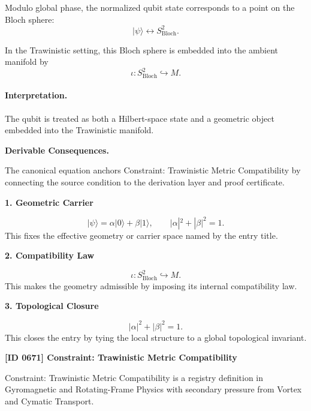 Modulo global phase, the normalized qubit state corresponds to a point on the Bloch sphere:
\begin{equation}
|\psi\rangle \longleftrightarrow S^2_{\mathrm{Bloch}} .
\end{equation}

In the Trawinistic setting, this Bloch sphere is embedded into the ambient manifold by
\begin{equation}
\boxed{
\iota:S^2_{\mathrm{Bloch}}\hookrightarrow M .
}
\end{equation}

\paragraph{Interpretation.}
The qubit is treated as both a Hilbert-space state and a geometric object embedded into the Trawinistic manifold.

\par\vspace{0.35em}
\noindent\textbf{Derivable Consequences.}\quad
\begingroup
\footnotesize
\raggedright
The canonical equation anchors Constraint: Trawinistic Metric Compatibility by connecting the source condition to the derivation layer and proof certificate.
\par\endgroup

\noindent\textbf{1. Geometric Carrier}\par
\[
|\psi\rangle = \alpha|0\rangle+\beta|1\rangle, \qquad |\alpha|^2+|\beta|^2=1.
\]
\noindent This fixes the effective geometry or carrier space named by the entry title.\par
\noindent\textbf{2. Compatibility Law}\par
\[
\iota:S^2_{\mathrm{Bloch}}\hookrightarrow M.
\]
\noindent This makes the geometry admissible by imposing its internal compatibility law.\par
\noindent\textbf{3. Topological Closure}\par
\[
|\alpha|^2+|\beta|^2=1.
\]
\noindent This closes the entry by tying the local structure to a global topological invariant.\par

\clearpage
\noindent\textbf{[ID 0671] Constraint: Trawinistic Metric Compatibility}\par
\vspace{0.35em}
\begingroup\small
{}
Constraint: Trawinistic Metric Compatibility is a registry definition in Gyromagnetic and Rotating-Frame Physics with secondary pressure from Vortex and Cymatic Transport.

